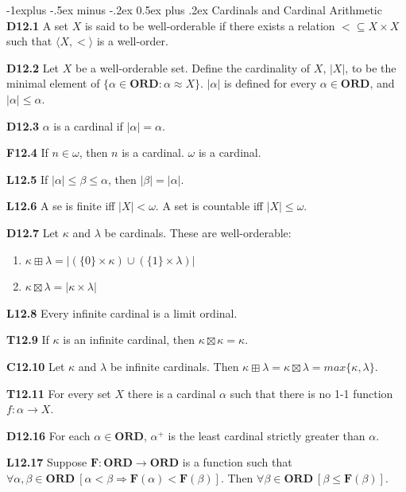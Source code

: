 \documentclass[10pt, landscape]{article}
\makeatletter
\renewcommand{\section}{\@startsection{section}{1}{0mm}%
                                {-1ex plus -.5ex minus -.2ex}%
                                {0.5ex plus .2ex}%
                                {\normalfont\large\bfseries}}
\renewcommand{\section}{\@startsection{section}{2}{0mm}%
                                {-1explus -.5ex minus -.2ex}%
                                {0.5ex plus .2ex}%
                                {\normalfont\normalsize\bfseries}}
\makeatother
\begin{document}
\begin{multicols*}{3}
\section{Cardinals and Cardinal Arithmetic}
\textbf{D12.1} A set $X$ is said to be well-orderable if there exists a relation $<\subseteq X \times X$ such that $\langle X, < \rangle$ is a well-order.

\textbf{D12.2} Let $X$ be a well-orderable set. Define the cardinality of $X$, $|X|$, to be the minimal element of $\{\alpha\in\mathbf{ORD}:\alpha\approx X\}$. $|\alpha|$ is defined for every $\alpha\in\mathbf{ORD}$, and $|\alpha|\leq\alpha$.

\textbf{D12.3} $\alpha$ is a cardinal if $|\alpha|=\alpha$.

\textbf{F12.4} If $n\in\omega$, then $n$ is a cardinal. $\omega$ is a cardinal.

\textbf{L12.5} If $|\alpha|\leq\beta\leq\alpha$, then $|\beta|=|\alpha|$.

\textbf{L12.6} A se is finite iff $|X|<\omega$. A set is countable iff $|X|\leq\omega$.

\textbf{D12.7} Let $\kappa$ and $\lambda$ be cardinals. These are well-orderable:
\begin{enumerate}
    \item $\kappa\boxplus\lambda=|(\{0\}\times\kappa)\cup(\{1\}\times\lambda)|$
    \item $\kappa\boxtimes\lambda=|\kappa\times\lambda|$
\end{enumerate}

\textbf{L12.8} Every infinite cardinal is a limit ordinal.

\textbf{T12.9} If $\kappa$ is an infinite cardinal, then $\kappa\boxtimes\kappa=\kappa$.

\textbf{C12.10} Let $\kappa$ and $\lambda$ be infinite cardinals. Then $\kappa\boxplus\lambda=\kappa\boxtimes\lambda=max\{\kappa,\lambda\}$.

\textbf{T12.11} For every set $X$ there is a cardinal $\alpha$ such that there is no 1-1 function $f:\alpha\rightarrow X$.

\textbf{D12.16} For each $\alpha\in\mathbf{ORD}$, $\alpha^+$ is the least cardinal strictly greater than $\alpha$.

\textbf{L12.17} Suppose $\mathbf{F:ORD\rightarrow ORD}$ is a function such that $\forall\alpha,\beta\in\mathbf{ORD}\ [\alpha<\beta\Rightarrow\mathbf{F}(\alpha)<\mathbf{F}(\beta)]$. Then $\forall\beta\in\mathbf{ORD}\ [\beta\leq\mathbf{F}(\beta)]$.


\end{multicols*}
\end{document}
